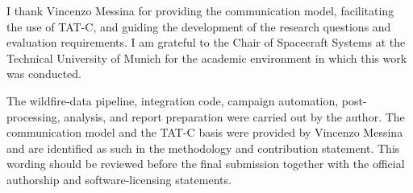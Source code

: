 I thank Vincenzo Messina for providing the communication model, facilitating the use of TAT-C, and guiding the development of the research questions and evaluation requirements. I am grateful to the Chair of Spacecraft Systems at the Technical University of Munich for the academic environment in which this work was conducted.

The wildfire-data pipeline, integration code, campaign automation, post-processing, analysis, and report preparation were carried out by the author. The communication model and the TAT-C basis were provided by Vincenzo Messina and are identified as such in the methodology and contribution statement. This wording should be reviewed before the final submission together with the official authorship and software-licensing statements.


